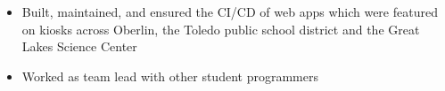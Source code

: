 \documentclass[margin]{res}
\newcommand\rurl[1]{%
  \href{http://#1}{\nolinkurl{#1}}%
}
\begin{document}
\begin{resume}
  \begin{itemize}
    \item Built, maintained, and ensured the CI/CD of web apps which were featured on kiosks across Oberlin, the Toledo public school district and the Great Lakes Science Center %
    \item Worked as team lead with other student programmers%
  \end{itemize}



\end{resume}
\end{document}
